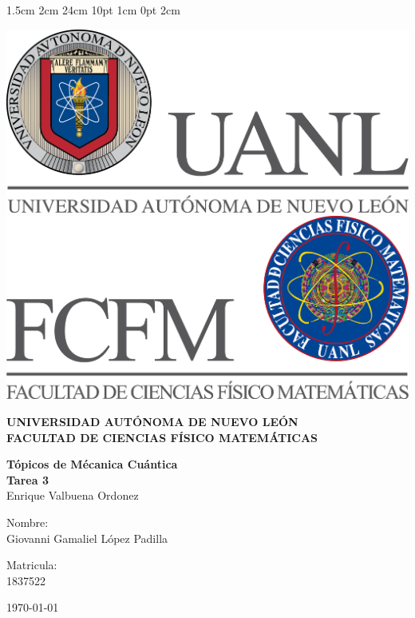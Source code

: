 \documentclass[12pt,letterpaper]{report}
\begin{document}
\setmargins{2.5cm}      
{1.5cm}                     
{2cm}  
{24cm}                    
{10pt}                          
{1cm}                          
{0pt}                             
{2cm}
\begin{titlepage}
\begin{center}
\includegraphics[scale=0.40]{../../Logos/uanl.png} 
\hspace{2.5cm}
\includegraphics[scale=0.40]{../../Logos/fcfm.png}
\end{center}
\vspace{2cm}
\begin{center}
\textbf{
UNIVERSIDAD AUTÓNOMA DE NUEVO LEÓN\\
FACULTAD DE CIENCIAS
    FÍSICO MATEMÁTICAS}\\
\vspace*{2cm}
\begin{large}
\vspace{1cm}
\large{\textbf{Tópicos de Mécanica Cuántica}}\\
\textbf{Tarea 3}\\
Enrique Valbuena Ordonez\\
\end{large}
\vspace{3.5cm}
\begin{minipage}{0.6\linewidth}
\vspace{0.5cm}
\changefontsizes{14pt}
Nombre:\\
Giovanni Gamaliel López Padilla\\
\end{minipage}
\begin{minipage}{0.2\linewidth}
\changefontsizes{14pt}
Matricula:\\
1837522
\end{minipage}
\end{center}
\vspace{4cm}
\begin{flushright}
\today
\end{flushright}
\end{titlepage}
\end{document}
